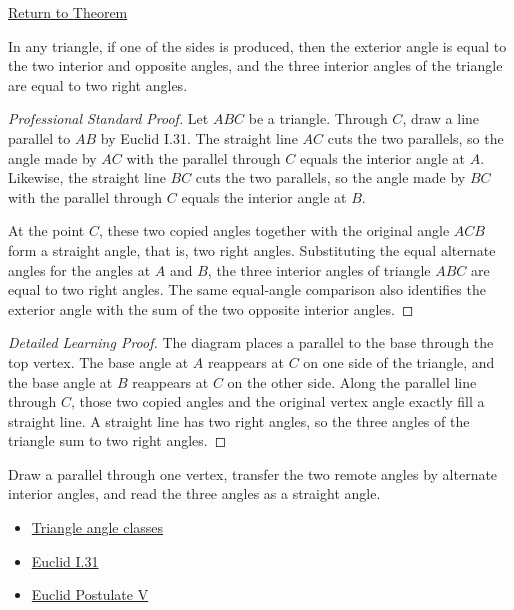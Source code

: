 \newpage
{}
\label{prf:euclid-i-32}

\begin{remark*}[Return]
\hyperref[thm:euclid-i-32]{Return to Theorem}
\end{remark*}

\begin{theorem*}
In any triangle, if one of the sides is produced, then the exterior angle is
equal to the two interior and opposite angles, and the three interior angles of
the triangle are equal to two right angles.
\end{theorem*}



\begin{proof}[Professional Standard Proof]
\LRAProofBodyStart
Let $ABC$ be a triangle. Through $C$, draw a line parallel to $AB$ by Euclid
I.31. The straight line $AC$ cuts the two parallels, so the angle made by $AC$
with the parallel through $C$ equals the interior angle at $A$. Likewise, the
straight line $BC$ cuts the two parallels, so the angle made by $BC$ with the
parallel through $C$ equals the interior angle at $B$.

At the point $C$, these two copied angles together with the original angle
$ACB$ form a straight angle, that is, two right angles. Substituting the equal
alternate angles for the angles at $A$ and $B$, the three interior angles of
triangle $ABC$ are equal to two right angles. The same equal-angle comparison
also identifies the exterior angle with the sum of the two opposite interior
angles.
\end{proof}

\begin{proof}[Detailed Learning Proof]
\LRAProofBodyStart
The diagram places a parallel to the base through the top vertex. The base
angle at $A$ reappears at $C$ on one side of the triangle, and the base angle
at $B$ reappears at $C$ on the other side. Along the parallel line through
$C$, those two copied angles and the original vertex angle exactly fill a
straight line. A straight line has two right angles, so the three angles of the
triangle sum to two right angles.
\end{proof}

\begin{remark*}
Draw a parallel through one vertex, transfer the two remote angles by alternate
interior angles, and read the three angles as a straight angle.
\end{remark*}

\begin{dependencies}
\begin{itemize}
  \item \hyperref[def:euclid-triangle-angle-classes]{Triangle angle classes}
  \item \hyperref[thm:euclid-i-31]{Euclid I.31}
  \item \hyperref[ax:euclid-postulate-parallel]{Euclid Postulate V}
\end{itemize}
\end{dependencies}

\clearpage
